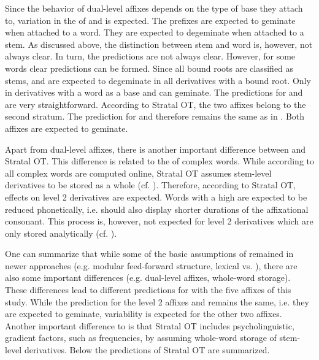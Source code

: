 Since the behavior of dual-level affixes depends on the type of base they attach to, variation in the  of  and  is expected. The prefixes are expected to geminate when attached to a word. They are expected to degeminate when attached to a stem. As discussed above, the distinction between stem and word is, however, not always clear. In turn, the predictions are not always clear. However, for some words clear predictions can be formed. Since all bound roots are classified as stems,  and  are expected to degeminate in all derivatives with a bound root. Only in derivatives with a word as a base  and  can geminate.
The predictions for  and  are very straightforward. According to Stratal OT, the two affixes belong to the second stratum. The prediction for  and  therefore remains the same as in . Both affixes are expected to geminate.



Apart from dual-level affixes, there is another important difference between  and Stratal OT.  This difference is related to the  of complex words. While according to  all complex words are computed online, Stratal OT assumes stem-level derivatives to be stored as a whole (cf. \citealt[chapter 3]{BermudezOtero.2012}). Therefore, according to Stratal OT,  effects on level 2 derivatives are expected.  Words with a high  are expected to be reduced phonetically, i.e. should also display shorter durations of the affixational consonant. This  process is, however, not expected for level 2 derivatives which are only stored analytically (cf. \citealt[chapter 3.3]{BermudezOtero.2012}). 



One can summarize that while some of the basic assumptions of  remained in newer approaches (e.g. modular feed-forward structure, lexical vs. ), there are also some important differences (e.g. dual-level affixes, {whole-word storage}). These differences lead to different predictions for  with the five affixes of this study. While the prediction for the level 2 affixes  and  remains the same, i.e. they are expected to geminate, variability is expected for the other two affixes. Another important difference to  is that Stratal OT includes psycholinguistic, gradient factors, such as frequencies, by assuming {whole-word storage} of stem-level derivatives. Below the predictions of Stratal OT are summarized.\\


